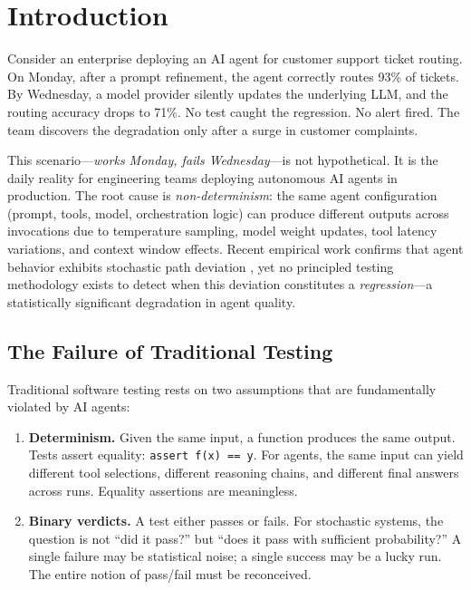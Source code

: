 
\section{Introduction}
\label{sec:introduction}

Consider an enterprise deploying an AI agent for customer support ticket
routing. On Monday, after a prompt refinement, the agent correctly routes
93\% of tickets. By Wednesday, a model provider silently updates the
underlying LLM, and the routing accuracy drops to 71\%. No test caught
the regression. No alert fired. The team discovers the degradation only
after a surge in customer complaints.

This scenario---\emph{works Monday, fails Wednesday}---is not
hypothetical. It is the daily reality for engineering teams deploying
autonomous AI agents in production. The root cause is
\emph{non-determinism}: the same agent configuration (prompt, tools,
model, orchestration logic) can produce different outputs across
invocations due to temperature sampling, model weight updates, tool
latency variations, and context window effects. Recent empirical work
confirms that agent behavior exhibits stochastic path deviation
\citep{kapoor2024capable}, yet no principled testing methodology exists
to detect when this deviation constitutes a \emph{regression}---a
statistically significant degradation in agent quality.

\subsection{The Failure of Traditional Testing}
\label{sec:intro:failure}

Traditional software testing rests on two assumptions that are
fundamentally violated by AI agents:

\begin{enumerate}[leftmargin=*]
  \item \textbf{Determinism.} Given the same input, a function produces
    the same output. Tests assert equality: \texttt{assert f(x) == y}.
    For agents, the same input can yield different tool selections,
    different reasoning chains, and different final answers across runs.
    Equality assertions are meaningless.

  \item \textbf{Binary verdicts.} A test either passes or fails. For
    stochastic systems, the question is not ``did it pass?'' but ``does
    it pass with sufficient probability?'' A single failure may be
    statistical noise; a single success may be a lucky run. The entire
    notion of pass/fail must be reconceived.
\end{enumerate}

